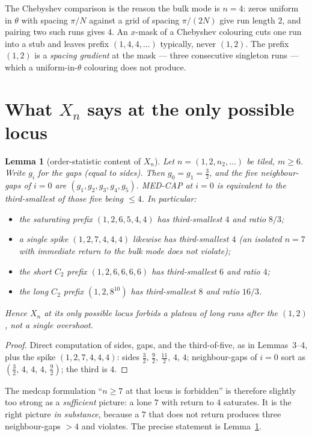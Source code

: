 \documentclass[11pt]{article}
\newtheorem{lemma}{Lemma}
\theoremstyle{remark}
\begin{document}
The Chebyshev comparison is the reason the bulk mode is $n=4$: zeros
uniform in $\theta$ with spacing $\pi/N$ against a grid of spacing
$\pi/(2N)$ give run length $2$, and pairing two such runs gives $4$.
An $x$-mask of a Chebyshev colouring cuts one run into a stub and
leaves prefix $(1,4,4,\ldots)$ typically, never $(1,2)$.  The
prefix $(1,2)$ is a \emph{spacing gradient} at the mask --- three
consecutive singleton runs --- which a uniform-in-$\theta$ colouring
does not produce.

\section{What $X_n$ says at the only possible locus}\label{sec:return}

\begin{lemma}[order-statistic content of $X_n$]\label{lem:return-geom}
Let $n=(1,2,n_2,\ldots)$ be tiled, $m\ge 6$.  Write $g_i$ for the
gaps (equal to sides).  Then $g_0=g_1=\tfrac32$, and the five
neighbour-gaps of $i=0$ are
$(g_1,g_2,g_3,g_4,g_5)$.  MED-CAP at $i=0$ is equivalent to the
third-smallest of those five being $\le 4$.  In particular:
\begin{itemize}
\item the saturating prefix $(1,2,6,5,4,4)$ has third-smallest $4$
and ratio $8/3$;
\item a single spike $(1,2,7,4,4,4)$ likewise has third-smallest $4$
(an isolated $n=7$ with immediate return to the bulk mode does
\emph{not} violate);
\item the short $C_2$ prefix $(1,2,6,6,6,6)$ has third-smallest $6$
and ratio $4$;
\item the long $C_2$ prefix $(1,2,8^{10})$ has third-smallest $8$
and ratio $16/3$.
\end{itemize}
Hence $X_n$ at its only possible locus forbids a \emph{plateau} of
long runs after the $(1,2)$, not a single overshoot.
\end{lemma}

\begin{proof}
Direct computation of sides, gaps, and the third-of-five, as in
\cite{medcap} Lemmas~3--4, plus the spike $(1,2,7,4,4,4)$:
sides $\tfrac32,\,\tfrac92,\,\tfrac{11}2,\,4,\,4$; neighbour-gaps of
$i=0$ sort as $(\tfrac32,\,4,\,4,\,4,\,\tfrac92)$; the third is $4$.
\end{proof}

The medcap formulation ``$n\ge 7$ at that locus is forbidden'' is
therefore slightly too strong as a \emph{sufficient} picture: a
lone $7$ with return to $4$ saturates.  It is the right picture
\emph{in substance}, because a $7$ that does not return produces
three neighbour-gaps $>4$ and violates.  The precise statement is
Lemma~\ref{lem:return-geom}.
\end{document}
